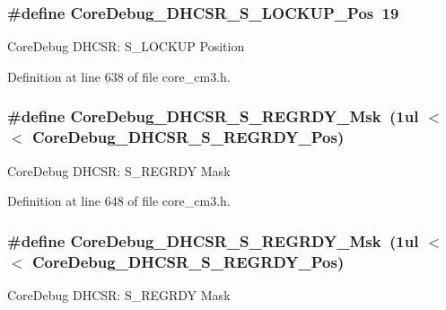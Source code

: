 \subsubsection[{\texorpdfstring{Core\+Debug\+\_\+\+D\+H\+C\+S\+R\+\_\+\+S\+\_\+\+L\+O\+C\+K\+U\+P\+\_\+\+Pos}{CoreDebug_DHCSR_S_LOCKUP_Pos}}]{\setlength{\rightskip}{0pt plus 5cm}\#define Core\+Debug\+\_\+\+D\+H\+C\+S\+R\+\_\+\+S\+\_\+\+L\+O\+C\+K\+U\+P\+\_\+\+Pos~19}\hypertarget{group___c_m_s_i_s___c_m3___core_debug_ga2900dd56a988a4ed27ad664d5642807e}{}\label{group___c_m_s_i_s___c_m3___core_debug_ga2900dd56a988a4ed27ad664d5642807e}
Core\+Debug D\+H\+C\+SR\+: S\+\_\+\+L\+O\+C\+K\+UP Position 

Definition at line 638 of file core\+\_\+cm3.\+h.

\subsubsection[{\texorpdfstring{Core\+Debug\+\_\+\+D\+H\+C\+S\+R\+\_\+\+S\+\_\+\+R\+E\+G\+R\+D\+Y\+\_\+\+Msk}{CoreDebug_DHCSR_S_REGRDY_Msk}}]{\setlength{\rightskip}{0pt plus 5cm}\#define Core\+Debug\+\_\+\+D\+H\+C\+S\+R\+\_\+\+S\+\_\+\+R\+E\+G\+R\+D\+Y\+\_\+\+Msk~(1ul $<$$<$ Core\+Debug\+\_\+\+D\+H\+C\+S\+R\+\_\+\+S\+\_\+\+R\+E\+G\+R\+D\+Y\+\_\+\+Pos)}\hypertarget{group___c_m_s_i_s___c_m3___core_debug_gac4cd6f3178de48f473d8903e8c847c07}{}\label{group___c_m_s_i_s___c_m3___core_debug_gac4cd6f3178de48f473d8903e8c847c07}
Core\+Debug D\+H\+C\+SR\+: S\+\_\+\+R\+E\+G\+R\+DY Mask 

Definition at line 648 of file core\+\_\+cm3.\+h.

\subsubsection[{\texorpdfstring{Core\+Debug\+\_\+\+D\+H\+C\+S\+R\+\_\+\+S\+\_\+\+R\+E\+G\+R\+D\+Y\+\_\+\+Msk}{CoreDebug_DHCSR_S_REGRDY_Msk}}]{\setlength{\rightskip}{0pt plus 5cm}\#define Core\+Debug\+\_\+\+D\+H\+C\+S\+R\+\_\+\+S\+\_\+\+R\+E\+G\+R\+D\+Y\+\_\+\+Msk~(1ul $<$$<$ Core\+Debug\+\_\+\+D\+H\+C\+S\+R\+\_\+\+S\+\_\+\+R\+E\+G\+R\+D\+Y\+\_\+\+Pos)}\hypertarget{group___c_m_s_i_s___c_m3___core_debug_gac4cd6f3178de48f473d8903e8c847c07}{}\label{group___c_m_s_i_s___c_m3___core_debug_gac4cd6f3178de48f473d8903e8c847c07}
Core\+Debug D\+H\+C\+SR\+: S\+\_\+\+R\+E\+G\+R\+DY Mask 

